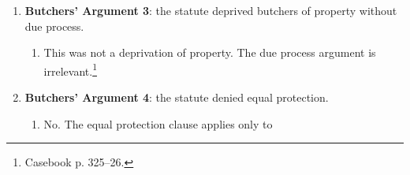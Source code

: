 \begin{enumerate}
\begin{enumerate}
\begin{enumerate}
            \item The privileges and immunities clause protects only 
            \emph{federal} rights against encroachment by the 
            states.\footnote{``No State shall make or enforce any law which 
            shall abridge the privileges or immunities of citizens of the 
            United States~.~.~.~'' U.S.  Const. amend. XIV, \S\ 1.}
            \item \emph{Corfield v. Coryell}: ``privileges and immunities'' 
            covers a broad range of ``fundamental'' rights (property, 
            happiness, safety).\footnote{Casebook p. 324.} This broadness 
            would grant the Court the power to strike down a wide range of 
            state legislation, which would be an unacceptable structural 
            shift.
            \item States are responsible for a large domain of civil rights. 
            The Fourteenth Amendment did not expand the power of the Court to 
            act as a ``perpetual censor upon all legislation of the States, on 
            the civil rights of their own citizens~.~.~.~''\footnote{Casebook 
            p. 324.} Such an interpretation would also grant broad police 
            powers to Congress (in violation of the principle of enumerated 
            powers), which would ``fetter and degrade'' the states and 
            ``radically change[] the whole theory of the relations of the 
            State and Federal governments to each 
            other~.~.~.~''\footnote{Casebook p. 325.}
            \item Federal civil rights include asserting claims against the 
            government, right to assembly, right to petition for redress of 
            grievances, and habeus corpus.
        \end{enumerate}
        \item \textbf{Butchers' Argument 3}: the statute deprived butchers of property 
        without due process.
        \begin{enumerate}
            \item This was not a deprivation of property. The due process 
            argument is irrelevant.\footnote{Casebook p. 325--26.}
        \end{enumerate}
        \item \textbf{Butchers' Argument 4}: the statute denied equal protection.
        \begin{enumerate}
            \item No. The equal protection clause applies only to 

\end{enumerate}
\end{enumerate}
\end{enumerate}
